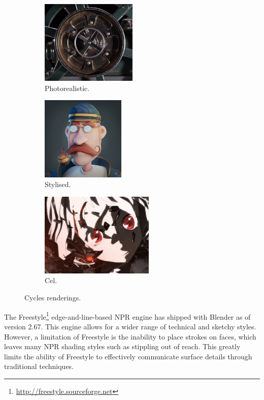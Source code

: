 \begin{figure}[h]
	\centering
	\begin{subfigure}[b]{0.3\textwidth}
		\includegraphics[height=4cm]{images/ex_photoreal}
		\caption{Photorealistic.}\label{ex_photoreal}
	\end{subfigure}
	\begin{subfigure}[b]{0.3\textwidth}
		\includegraphics[height=4cm]{images/ex_toon1}
		\caption{Stylised.}\label{ex_toon1}
	\end{subfigure}
	\begin{subfigure}[b]{0.3\textwidth}
		\includegraphics[height=4cm]{images/ex_toon2}
		\caption{Cel.}\label{ex_toon2}
	\end{subfigure}
	\caption{Cycles renderings.}
\end{figure}

The Freestyle\footnote{\url{http://freestyle.sourceforge.net}} edge-and-line-based NPR engine has shipped with Blender as of version 2.67. This engine allows for a wider range of technical and sketchy styles. However, a limitation of Freestyle is the inability to place strokes on faces, which leaves many NPR shading styles such as stippling out of reach. This greatly limits the ability of Freestyle to effectively communicate surface details through traditional techniques.


